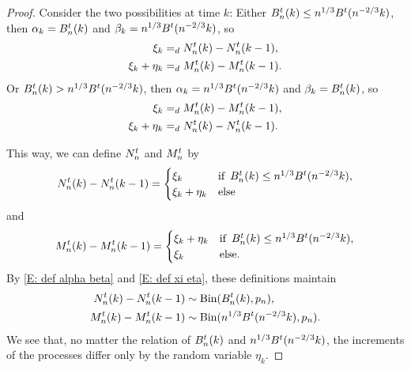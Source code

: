 \begin{proof}
Consider the two possibilities at time $k$:
Either $B_n^t(k) \leq n^{1 / 3}B^t(n^{-2 / 3}k)$,
then $\alpha_k = B_n^t(k)$ and $\beta_k = n^{1 / 3}B^t(n^{-2 / 3}k)$, 
so 
\begin{equation}
\begin{aligned}
\xi_k &=_d N_n^t(k) - N_n^t(k-1), \\
\xi_k + \eta_k &=_d M_n^t(k) - M_n^t(k-1).
\end{aligned}
\end{equation}
Or $B_n^t(k) > n^{1 / 3}B^t(n^{-2 / 3}k)$,
then $\alpha_k = n^{1 / 3}B^t(n^{-2 / 3}k)$ and $\beta_k = B_n^t(k)$, 
so
\begin{equation}
\begin{aligned}
\xi_k &=_d M_n^t(k) - M_n^t(k-1), \\
\xi_k + \eta_k &=_d N_n^t(k) - N_n^t(k-1).
\end{aligned}
\end{equation}

This way, we can define $N_n^t$ and $M_n^t$ by
\begin{equation*}
N_n^t(k) - N_n^t(k-1) = 
\begin{cases}
\xi_k & \text{if} \enspace B_n^t(k) \leq n^{1 / 3}B^t(n^{-2 / 3}k), \\
\xi_k + \eta_k &\text{else}
\end{cases}
\end{equation*}
and
\begin{equation*}
M_n^t(k) - M_n^t(k-1) = 
\begin{cases}
\xi_k + \eta_k & \text{if} \enspace B_n^t(k) \leq n^{1 / 3}B^t(n^{-2 / 3}k), \\
\xi_k &\text{else}.
\end{cases}
\end{equation*}
By \eqref{E: def alpha beta} and \eqref{E: def xi eta},
these definitions maintain
\begin{equation}
\begin{aligned}
N_n^t(k) - N_n^t(k-1) &\sim \operatorname*{Bin}(B_n^t(k), p_n), \\
M_n^t(k) - M_n^t(k-1) &\sim \operatorname*{Bin}(n^{1 / 3} B^t(n^{-2 / 3}k), p_n).
\end{aligned}
\end{equation}
We see that, no matter the relation of $B_n^t(k)$ and $n^{1 / 3}B^t(n^{-2 / 3}k)$, 
the increments of the processes differ only by the random variable $\eta_k$.


\end{proof}
